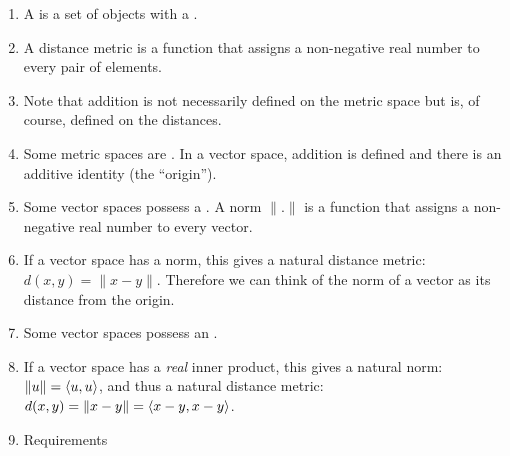 \begin{enumerate}
\item A  is a set of objects with a .
\item A distance metric is a function that assigns a non-negative real number to every pair of
  elements.
\item Note that addition is not necessarily defined on the metric space but is, of course, defined
  on the distances.
\item Some metric spaces are . In a vector space, addition is defined and there
  is an additive identity (the ``origin'').
\item Some vector spaces possess a . A norm $\|.\|$ is a function that assigns a
  non-negative real number to every vector.
\item If a vector space has a norm, this gives a natural distance metric: $d(x, y) = \|x -
  y\|$. Therefore we can think of the norm of a vector as its distance from the origin.
\item Some vector spaces possess an .
\item If a vector space has a {\it real} inner product, this gives a natural norm:
  $\|u\| = \langle u, u\rangle$, and thus a natural distance metric:
  $d(x, y) = \|x - y\| = \langle x - y, x - y \rangle$.
\item Requirements


\end{enumerate}
